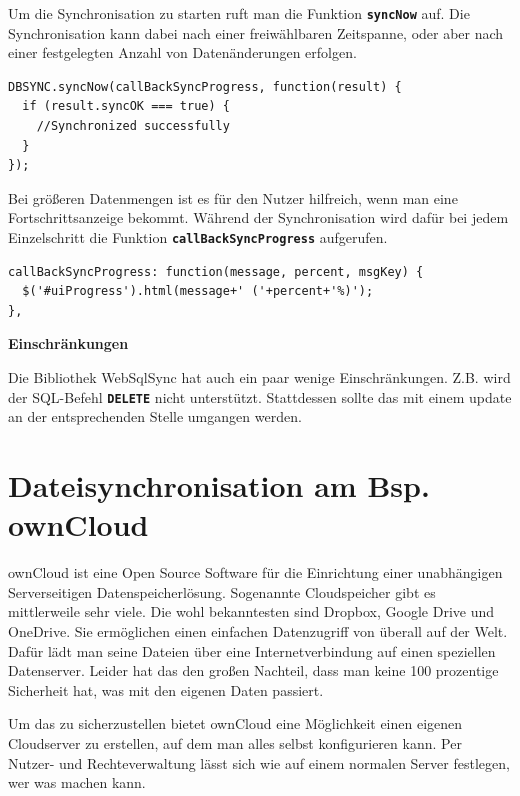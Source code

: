 Um die Synchronisation zu starten ruft man die Funktion \textbf{\lstinline$syncNow$} auf. Die Synchronisation kann dabei nach einer freiwählbaren Zeitspanne, oder aber nach einer festgelegten Anzahl von Datenänderungen erfolgen.

\lstset{language=html}
\begin{lstlisting}
DBSYNC.syncNow(callBackSyncProgress, function(result) {
  if (result.syncOK === true) {
    //Synchronized successfully
  }
});
\end{lstlisting}

Bei größeren Datenmengen ist es für den Nutzer hilfreich, wenn man eine Fortschrittsanzeige bekommt. Während der Synchronisation wird dafür bei jedem Einzelschritt die Funktion \textbf{\lstinline$callBackSyncProgress$} aufgerufen.

\lstset{language=html}
\begin{lstlisting}
callBackSyncProgress: function(message, percent, msgKey) {
  $('#uiProgress').html(message+' ('+percent+'%)');
},
\end{lstlisting}

\textbf{Einschränkungen}

Die Bibliothek WebSqlSync hat auch ein paar wenige Einschränkungen. Z.B. wird der \ac{SQL}-Befehl \textbf{\lstinline$DELETE$} nicht unterstützt. Stattdessen sollte das mit einem update an der entsprechenden Stelle umgangen werden.

\section{Dateisynchronisation am Bsp. ownCloud}
\label{sec:datasync}

ownCloud ist eine Open Source Software für die Einrichtung einer unabhängigen Serverseitigen Datenspeicherlösung. Sogenannte Cloudspeicher gibt es mittlerweile sehr viele. Die wohl bekanntesten sind Dropbox, Google Drive und OneDrive. Sie ermöglichen einen einfachen Datenzugriff von überall auf der Welt. Dafür lädt man seine Dateien über eine Internetverbindung auf einen speziellen Datenserver. Leider hat das den großen Nachteil, dass man keine 100 prozentige Sicherheit hat, was mit den eigenen Daten passiert.

Um das zu sicherzustellen bietet ownCloud eine Möglichkeit einen eigenen Cloudserver zu erstellen, auf dem man alles selbst konfigurieren kann. Per Nutzer- und Rechteverwaltung lässt sich wie auf einem normalen Server festlegen, wer was machen kann.

